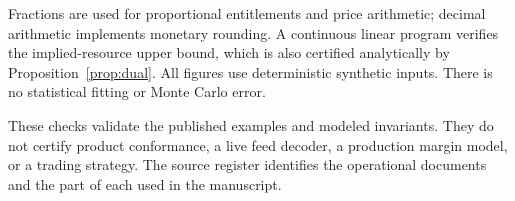 Fractions are used for proportional entitlements and price arithmetic; decimal arithmetic implements monetary rounding. A continuous linear program verifies the implied-resource upper bound, which is also certified analytically by Proposition~\ref{prop:dual}. All figures use deterministic synthetic inputs. There is no statistical fitting or Monte Carlo error.

These checks validate the published examples and modeled invariants. They do not certify product conformance, a live feed decoder, a production margin model, or a trading strategy. The source register identifies the operational documents and the part of each used in the manuscript.
\FloatBarrier
